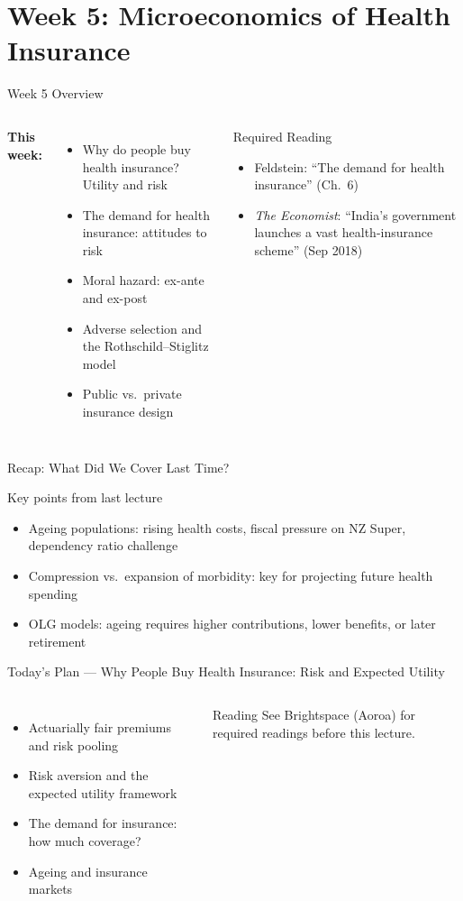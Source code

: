 \documentclass[aspectratio=169, 12pt]{beamer}
\newcommand{\recapslide}[1]{%
  \begin{frame}{Recap: What Did We Cover Last Time?}
    \begin{block}{Key points from last lecture}
      \begin{itemize}#1\end{itemize}
    \end{block}
  \end{frame}}
\newcommand{\planslide}[2]{%
  \begin{frame}{Today's Plan — #1}
    \begin{columns}
      \column{0.6\textwidth}
      \begin{itemize}#2\end{itemize}
      \column{0.38\textwidth}
      \begin{alertblock}{Reading}
        \footnotesize See Brightspace (Aoroa) for required readings before this lecture.
      \end{alertblock}
    \end{columns}
  \end{frame}}
\begin{document}
\section{Week 5: Microeconomics of Health Insurance}

\begin{frame}{Week 5 Overview}
  \begin{columns}
      \textbf{This week:}
      \begin{itemize}
        \item Why do people buy health insurance? Utility and risk
        \item The demand for health insurance: attitudes to risk
        \item Moral hazard: ex-ante and ex-post
        \item Adverse selection and the Rothschild--Stiglitz model
        \item Public vs.\ private insurance design
      \end{itemize}
      \begin{block}{Required Reading}
        {\small
        \begin{itemize}
          \item Feldstein: ``The demand for health insurance'' (Ch.\ 6)
          \item \textit{The Economist}: ``India's government launches a vast health-insurance scheme'' (Sep 2018)
        \end{itemize}}
      \end{block}
  \end{columns}
\end{frame}

\recapslide{
  \item Ageing populations: rising health costs, fiscal pressure on NZ Super, dependency ratio challenge
  \item Compression vs.\ expansion of morbidity: key for projecting future health spending
  \item OLG models: ageing requires higher contributions, lower benefits, or later retirement
}

\planslide{Why People Buy Health Insurance: Risk and Expected Utility}{
  \item Actuarially fair premiums and risk pooling
  \item Risk aversion and the expected utility framework
  \item The demand for insurance: how much coverage?
  \item Ageing and insurance markets
}
\end{document}
